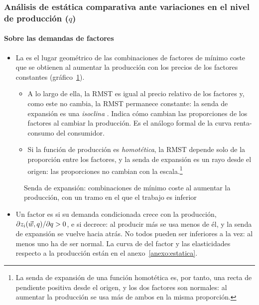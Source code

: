 \documentclass[11pt]{article}
\begin{document}
\subsubsection{Análisis de estática comparativa ante variaciones en el nivel de producción (\texorpdfstring{$q$}{q})}\label{sec:analisis-estatica-comparativa-variaciones}

\paragraph{Sobre las demandas de factores}

\begin{itemize}
\item La  es el lugar geométrico de las combinaciones de factores de mínimo coste que se obtienen al aumentar la producción con los precios de los factores constantes (gráfico~\ref{fig:senda-expansion}).
  \begin{itemize}
  \item A lo largo de ella, la RMST es igual al precio relativo de los factores y, como este no cambia, la RMST permanece constante: la senda de expansión es una \emph{isoclina} . Indica cómo cambian las proporciones de los factores al cambiar la producción. Es el análogo formal de la curva renta-consumo del consumidor.
  \item Si la función de producción es \emph{homotética}, la RMST depende solo de la proporción entre los factores, y la senda de expansión es un rayo desde el origen: las proporciones no cambian con la escala.\footnote{La senda de expansión de una función homotética es, por tanto, una recta de pendiente positiva desde el origen, y los dos factores son normales: al aumentar la producción se usa más de ambos en la misma proporción.}
  \end{itemize}
\end{itemize}

\begin{figure}[H]
\centering
\caption{Senda de expansión: combinaciones de mínimo coste al aumentar la producción, con un tramo en el que el trabajo es inferior}\label{fig:senda-expansion}
\end{figure}

\begin{itemize}
\item Un factor es  si su demanda condicionada crece con la producción, $\partial z_i(\vec{w},q)/\partial q>0$, e  si decrece: al producir más se usa menos de él, y la senda de expansión se vuelve hacia atrás. No todos pueden ser inferiores a la vez: al menos uno ha de ser normal. La curva de  del factor y las elasticidades respecto a la producción están en el anexo~\ref{anexo:estatica}.
\end{itemize}
\end{document}

